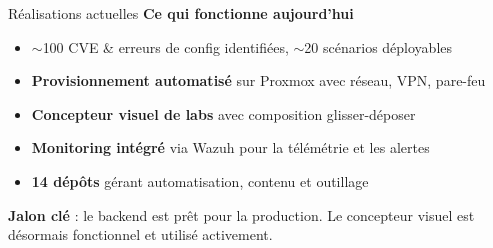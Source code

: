 \documentclass[aspectratio=169]{beamer}
\begin{document}
\begin{frame}{R\'ealisations actuelles \; \faCheckCircle}
  \textbf{Ce qui fonctionne aujourd'hui}
  \begin{itemize}
    \item \alert{$\sim$100 CVE \& erreurs de config identifi\'ees}, $\sim$20 sc\'enarios d\'eployables
    \item \textbf{Provisionnement automatis\'e} sur Proxmox avec r\'eseau, VPN, pare-feu
    \item \textbf{Concepteur visuel de labs} avec composition glisser-d\'eposer
    \item \textbf{Monitoring int\'egr\'e} via Wazuh pour la t\'el\'em\'etrie et les alertes
    \item \textbf{14 d\'ep\^ots} g\'erant automatisation, contenu et outillage
  \end{itemize}
  \vspace{2mm}
  \begin{tcolorbox}
    \faLightbulb\; \textbf{Jalon cl\'e} : le backend est pr\^et pour la production. Le concepteur visuel est d\'esormais fonctionnel et utilis\'e activement.
  \end{tcolorbox}
\end{frame}
\end{document}
